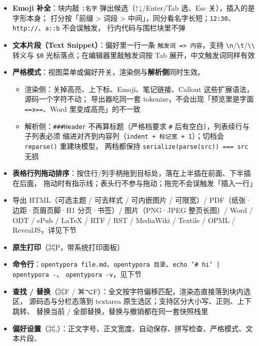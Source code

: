 \documentclass[11pt,a4paper]{ctexart}
\begin{document}
\begin{itemize}
批量搬、「下载全部远程图片」一次抓完；front matter 支持 \texttt{typora-copy-images-to}
与 \texttt{typora-root-url} —— \textbf{\texttt{⌘⌃I}、粘贴、拖入三种入口走同一套路径解析}；偏好里可开图片居中
\item \textbf{Emoji 补全}：块内敲 \texttt{:名字} 弹出候选（↑↓/Enter/Tab 选、Esc 关），插入的是字形本身；
打分按「前缀 \textgreater{} 词段 \textgreater{} 中间」，同分看名字长短；\texttt{12:30}、\texttt{http://}、\texttt{a::b} 不会误触发，
行内代码与围栏块里不弹
\item \textbf{文本片段（Text Snippet）}：偏好里一行一条 \texttt{触发词 =\textgreater{} 内容}，支持 \texttt{\textbackslash{}n}/\texttt{\textbackslash{}t}/\texttt{\textbackslash{}\textbackslash{}}
转义与 \texttt{\$0} 光标落点；在编辑器里敲触发词按 Tab 展开，中文触发词同样有效
\item \textbf{严格模式}：视图菜单或偏好开关，渲染侧与\textbf{解析侧}同时生效。
\begin{itemize}
\item 渲染侧：关掉高亮、上下标、Emoji、笔记链接、Callout 这些扩展语法，源码一个字符不动；
导出器吃同一套 tokenize，不会出现「预览里是字面 \texttt{==x==}、Word 里变成高亮」的不一致
\item 解析侧：\texttt{\#\#\#Header} 不再算标题（严格档要求 \texttt{\#} 后有空白），列表续行与子列表必须
缩进对齐到内容列（\texttt{indent + 标记宽 + 1}）；切档会 \texttt{reparse()} 重建块模型，
两档都保持 \texttt{serialize(parse(src)) === src} 无损
\end{itemize}
\item \textbf{表格行列拖动排序}：按住行/列手柄拖到目标处，落在上半插在前面、下半插在后面，
拖动时有指示线；表头行不参与拖动；拖完不会误触发「插入一行」
\item 导出 HTML（可选主题 / 可去样式 / 可内嵌图片 / 可限宽）/ PDF（纸张·边距·页眉页脚·H1 分页·书签）/
图片（PNG·JPEG 整页长图）/ Word / ODT / ePub / LaTeX / RTF / RST / MediaWiki /
Textile / OPML / RevealJS，详见下节
\item \textbf{原生打印}（⌘P，带系统打印面板）
\item \textbf{命令行}：\texttt{opentypora file.md}、\texttt{opentypora 目录}、\texttt{echo '\# hi' | opentypora -}、
\texttt{opentypora -v}，见下节
\item \textbf{查找 / 替换}（⌘F / ⌘⌥F）：全文按字符偏移匹配，渲染态直接落到块内选区，
源码态与分栏态落到 textarea 原生选区；支持区分大小写、正则、上下跳转、
替换当前 / 全部替换，替换与撤销都在同一套快照栈里
\item \textbf{偏好设置}（⌘,）：正文字号、正文宽度、自动保存、拼写检查、严格模式、文本片段、

\end{itemize}
\end{document}
